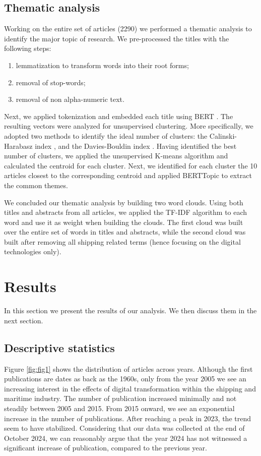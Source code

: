\documentclass[jmse,review,submit,pdftex,moreauthors]{Definitions/mdpi}
\begin{document}
\subsection{Thematic analysis}
Working on the entire set of articles (2290) we performed a thematic analysis to identify the major topic of research. We pre-processed the titles with the following steps:
\begin{enumerate}
	\item lemmatization to transform words into their root forms;
	\item removal of stop-words;
	\item removal of non alpha-numeric text.
\end{enumerate}
Next, we applied tokenization and embedded each title using BERT \citep{devlin2018bert}. The resulting vectors were analyzed for unsupervised clustering. More specifically, we adopted two methods to identify the ideal number of clusters: the Calinski-Harabasz index \citep{calinski1974dendrite}, and the Davies-Bouldin index \citep{davies1979cluster}.
Having identified the best number of clusters, we applied the unsupervised K-means algorithm and calculated the centroid for each cluster.
Next, we identified for each cluster the 10 articles closest to the corresponding centroid and applied BERTTopic to extract the common themes.

We concluded our thematic analysis by building two word clouds. Using both titles and abstracts from all articles, we applied the TF-IDF algorithm to each word and use it as weight when building the clouds. The first cloud was built over the entire set of words in titles and abstracts, while the second cloud was built after removing all shipping related terms (hence focusing on the digital technologies only).

\section{Results}

In this section we present the results of our analysis. We then discuss them in the next section.

\subsection{Descriptive statistics}
Figure \ref{fig:fig1} shows the distribution of articles across years. Although the first publications are dates as back as the 1960s, only from the year 2005 we see an increasing interest in the effects of digital transformation within the shipping and maritime industry. The number of publication increased minimally and not steadily between 2005 and 2015. From 2015 onward, we see an exponential increase in the number of publications. After reaching a peak in 2023, the trend seem to have stabilized. Considering that our data was collected at the end of October 2024, we can reasonably argue that the year 2024 has not witnessed a significant increase of publication, compared to the previous year.
\end{document}

